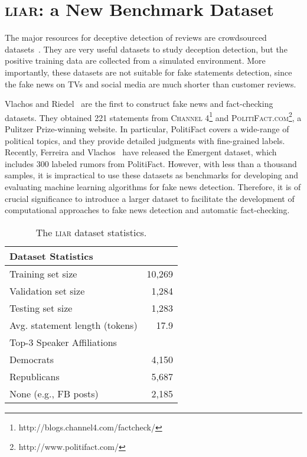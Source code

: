 \documentclass[11pt,a4paper]{article}
\begin{document}
\section{\textsc{liar}: a New Benchmark Dataset}
The major resources for deceptive detection of reviews are crowdsourced datasets~\cite{ott2011finding,perez2015experiments}. They are very useful datasets to study deception detection, but the positive training data are collected from a simulated environment. More importantly, these datasets are not suitable for fake statements detection, since the fake news on TVs and social media are much shorter than customer reviews. 

Vlachos and Riedel~ are the first to construct fake news and fact-checking datasets. They obtained 221 statements from \textsc{Channel 4}\footnote{http://blogs.channel4.com/factcheck/} and \textsc{PolitiFact.com}\footnote{http://www.politifact.com/}, a Pulitzer Prize-winning website. In particular, PolitiFact covers a wide-range of political topics, and
they provide detailed judgments with fine-grained labels. Recently,
Ferreira and Vlachos~ have released the Emergent dataset, which includes 300 labeled rumors from PolitiFact. However, with less than a thousand samples, it is impractical to use these datasets as benchmarks for developing and evaluating machine learning algorithms for fake news detection. Therefore, it is of crucial significance to introduce a larger dataset to facilitate the development of computational approaches to fake news detection and automatic fact-checking.

\begin{table}[t]
\begin{center}
\begin{tabular}{lr}

\hline
Dataset Statistics &\\
\hline
Training set size & 10,269\\
Validation set size & 1,284\\
Testing set size & 1,283\\
Avg. statement length (tokens) & 17.9 \\
\hline
Top-3 Speaker Affiliations & \\
Democrats & 4,150 \\
Republicans & 5,687 \\
None (e.g., FB posts) & 2,185\\
\hline
\end{tabular}
\caption{The \textsc{liar} dataset statistics.}
\label{tab:stats}
\end{center}
\end{table}
\end{document}
